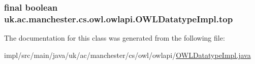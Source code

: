 \hypertarget{classuk_1_1ac_1_1manchester_1_1cs_1_1owl_1_1owlapi_1_1_o_w_l_datatype_impl_a70bc7223207e869d426f1411e6558862}{
\subsubsection[{top}]{\setlength{\rightskip}{0pt plus 5cm}final boolean uk.\-ac.\-manchester.\-cs.\-owl.\-owlapi.\-O\-W\-L\-Datatype\-Impl.\-top\hspace{0.3cm}{\ttfamily [private]}}}\label{classuk_1_1ac_1_1manchester_1_1cs_1_1owl_1_1owlapi_1_1_o_w_l_datatype_impl_a70bc7223207e869d426f1411e6558862}


The documentation for this class was generated from the following file\-:\begin{DoxyCompactItemize}
\item 
impl/src/main/java/uk/ac/manchester/cs/owl/owlapi/\hyperlink{_o_w_l_datatype_impl_8java}{O\-W\-L\-Datatype\-Impl.\-java}\end{DoxyCompactItemize}
